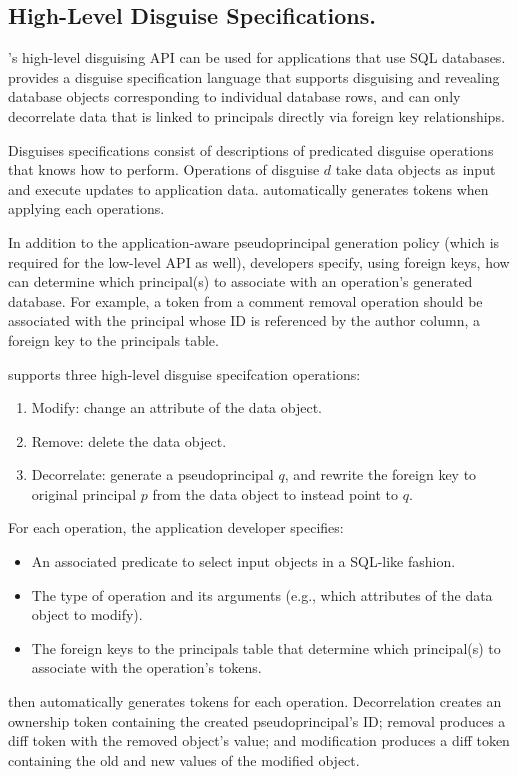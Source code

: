 \subsection{High-Level Disguise Specifications.} 
\sys's high-level disguising API can be used for applications that use SQL databases. \sys provides
a disguise specification language that supports disguising and revealing database objects
corresponding to individual database rows, and can only decorrelate data that is linked to
principals directly via foreign key relationships.

Disguises specifications consist of descriptions of predicated disguise operations that \sys knows
how to perform.  Operations of disguise $d$ take data objects as input and execute updates to
application data. \sys automatically generates tokens when applying each operations.

In addition to the application-aware pseudoprincipal generation policy (which is required for the
low-level API as well), developers specify, using foreign keys, how \sys can determine which
principal(s) to associate with an operation's generated database. For example, a token from a
comment removal operation should be associated with the principal whose ID is referenced by the
author column, a foreign key to the principals table.

\vspace{6pt}\noindent
\sys supports three high-level disguise specifcation operations:
\begin{enumerate}
    \item Modify: change an attribute of the data object.
    \item Remove: delete the data object.
    \item Decorrelate: generate a pseudoprincipal $q$, and rewrite the foreign key to original
        principal $p$ from the data object to instead point to $q$.  
\end{enumerate}

\noindent For each operation, the application developer specifies:
\begin{itemize}
    \item An associated predicate to select input objects in a SQL-like fashion.
    \item The type of operation and its arguments (e.g., which attributes of the data object to
        modify).
    \item The foreign keys to the principals table that determine which principal(s) to associate
        with the operation's tokens.
\end{itemize}
%
\sys then automatically generates tokens for each operation.
Decorrelation creates an ownership token  containing the created pseudoprincipal's
ID; removal produces a diff token  with the removed object's value; and modification
produces a diff token  containing the old and new values of the modified object.

